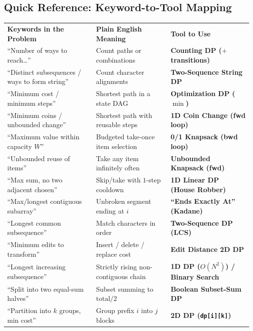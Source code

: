 \documentclass[11pt,a4paper]{article}
\theoremstyle{definition}
\begin{document}
\subsection*{Quick Reference: Keyword-to-Tool Mapping}

\begingroup\small{}
\begin{tabularx}{\textwidth}{>{\raggedright\arraybackslash}p{4.3cm} >{\raggedright\arraybackslash}X >{\raggedright\arraybackslash\bfseries}p{4.1cm}}
\arrayrulecolor{primaryblue}\toprule[1.2pt]
\rowcolor{primaryblue!10}
\textcolor{primaryblue}{\textbf{Keywords in the Problem}} & \textcolor{primaryblue}{\textbf{Plain English Meaning}} & \textcolor{primaryblue}{\textbf{Tool to Use}} \\
\arrayrulecolor{codeframe}\midrule[0.6pt]
``Number of ways to reach\dots'' & Count paths or combinations & Counting DP ($+$ transitions) \\
``Distinct subsequences / ways to form string'' & Count character alignments & Two-Sequence String DP \\
``Minimum cost / minimum steps'' & Shortest path in a state DAG & Optimization DP ($\min$) \\
``Minimum coins / unbounded change'' & Shortest path with reusable steps & 1D Coin Change (fwd loop) \\
``Maximum value within capacity $W$'' & Budgeted take-once item selection & 0/1 Knapsack (bwd loop) \\
``Unbounded reuse of items'' & Take any item infinitely often & Unbounded Knapsack (fwd) \\
``Max sum, no two adjacent chosen'' & Skip/take with $1$-step cooldown & 1D Linear DP (House Robber) \\
``Max/longest contiguous subarray'' & Unbroken segment ending at $i$ & ``Ends Exactly At'' (Kadane) \\
``Longest common subsequence'' & Match characters in order & Two-Sequence DP (LCS) \\
``Minimum edits to transform'' & Insert / delete / replace cost & Edit Distance 2D DP \\
``Longest increasing subsequence'' & Strictly rising non-contiguous chain & 1D DP ($O(N^2)$) / Binary Search \\
``Split into two equal-sum halves'' & Subset summing to $\text{total} / 2$ & Boolean Subset-Sum DP \\
``Partition into $k$ groups, min cost'' & Group prefix $i$ into $j$ blocks & 2D DP (\texttt{dp[i][k]}) \\

\end{tabularx}
\end{document}
